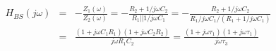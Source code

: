 \documentclass{article}
\begin{document}
\begin{itemize}
  \begin{eqnarray}
    H_{BS}(j\omega)&=&-\frac{Z_1(\omega)}{Z_2(\omega)}
    =-\frac{R_2+1/j\omega C_2}{R_1||1/j\omega C_1}
    =-\frac{R_2+1/j\omega C_2}{R_1/j\omega C_1/(R_1+1/j\omega C_1)}
    \nonumber \\
    &=& \frac{(1+j\omega C_1R_1)(1+j\omega C_2R_2)}{j\omega R_1C_2}
    =\frac{(1+j\omega\tau_1)(1+j\omega\tau_1)}{j\omega\tau_3}
  \end{eqnarray}

\end{itemize}

\begin{comment}

{\bf Example}

\htmladdimg{../figures/opampMF.png}

Apply KCL to the point between $C_1$ and $C_2$ denoted by $V$:
\begin{equation}
\frac{V_{in}-V}{1/j\omega C_1}+\frac{V_{out}-V}{1/j\omega C_2}
=\frac{V}{R_2}+\frac{V}{1/j\omega C_1}
\end{equation}
i.e.,
\begin{equation}
V_{in}j\omega C_1+V_{out}j\omega C_2
=\left(\frac{1}{R_2}+2j\omega C_1+j\omega C_2\right) V
=\left(\frac{1}{R_2}+j\omega(2C_1+C_2)\right) V
\end{equation}
Apply KCL to the inverting input of the op-amp which is virtually
grounded:
\begin{equation}
\frac{V}{1/j\omega C_1}+\frac{V_{out}}{R_1}=0
\;\;\;\;\;\;\mbox{i.e.}\;\;\;\;\;\;
V=-\frac{1}{j\omega R_1C_1}V_{out}
\end{equation}
Substitute into the first equation
\begin{eqnarray}
  V_{in}j\omega C_1+V_{out}j\omega C_2
  &=&-\left(\frac{1}{R_2}+j\omega(2C_1+C_2)\right) \frac{1}{j\omega R_1C_1}V_{out}
  \nonumber\\
  &=&-\left(\frac{1}{j\omega R_1R_2C_1}+\frac{2C_1+C_2}{R_1C_1}\right) V_{out}
\end{eqnarray}
Rearrange:
\begin{equation}
V_{in}
=-\frac{1}{j\omega C_1}\left(j\omega C_2+\frac{1}{j\omega R_1R_2C_1}+\frac{2C_1+C_2}{R_1C_1}\right) V_{out}
=\left(\frac{C_2}{C_1}+\frac{1}{(j\omega)^2 R_1R_2C^2_1}
+\frac{2C_1+C_2}{j\omega R_1C_1^2}\right) V_{out}
\end{equation}
Now we can find the FRF:
\begin{eqnarray}
H(j\omega)&=&\frac{V_{out}}{V_{in}}
=-\left(\frac{C_2}{C_1}+\frac{1}{(j\omega)^2 R_1R_2C_1^2}

\end{comment}
\end{document}
